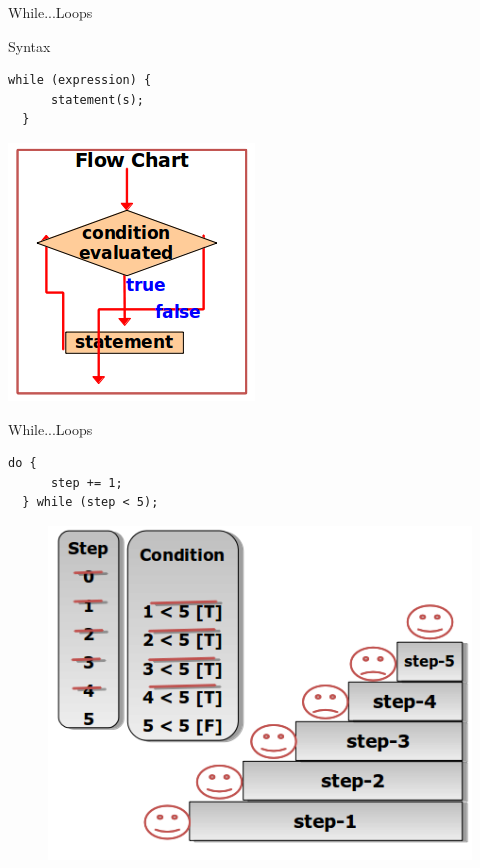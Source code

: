 \documentclass[14pt]{beamer}
\begin{document}
 \begin{frame}[fragile]{While...Loops}
 \begin{minipage}{5cm}
  \begin{block}{Syntax}
   \begin{lstlisting}[numbers=none]
  while (expression) { 
      statement(s);
  }
   \end{lstlisting}

  \end{block}
 \end{minipage}
 \quad
 \begin{minipage}{4cm}
  \includegraphics[scale=.4]{while-flow-chart.png}
 \end{minipage}
\end{frame}

\begin{frame}[fragile]{While...Loops}
\begin{minipage}{4cm}
\begin{lstlisting}[numbers=none]
  do {
      step += 1;
  } while (step < 5);  
 \end{lstlisting}
 \end{minipage}
 \quad
 \begin{minipage}{5cm}
 \begin{figure}[H]
 \begin{center}
  \includegraphics[scale=.4]{while-loop-iteration.png}
 \end{center}
 \end{figure}
  \end{minipage}
\end{frame}
\end{document}
